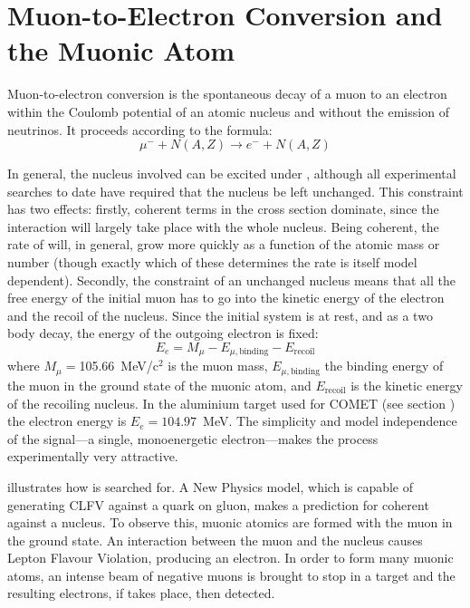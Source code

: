 
\chapter{Muon-to-Electron Conversion and the Muonic Atom}
Muon-to-electron conversion is the spontaneous decay of a muon to an electron within the Coulomb potential of an atomic nucleus and without the emission of neutrinos.
It proceeds according to the formula:
\begin{equation}
\mu^{-}+N(A,Z) \rightarrow e^{-}+N(A,Z)
\end{equation}

In general, the nucleus involved can be excited under \mueconv, although all experimental searches to date have required that the nucleus be left unchanged.
This constraint has two effects: firstly, coherent terms in the \mueconv cross section dominate, since the interaction will largely take place with the whole nucleus.
Being coherent, the rate of \mueconv will, in general, grow more quickly as a function of the atomic mass or number (though exactly which of these determines the rate is itself model dependent).
Secondly, the constraint of an unchanged nucleus means that all the free energy of the initial muon has to go into the kinetic energy of the electron and the recoil of the nucleus.
Since the initial system is at rest, and as a two body decay, the energy of the outgoing electron is fixed:
\begin{equation}
E_e=M_\mu-E_{\mu,\mathrm{binding}}-E_\mathrm{recoil}
\end{equation}
where $M_\mu=$105.66~MeV/c$^2$ is the muon mass, $E_{\mu,\mathrm{binding}}$ the
binding energy of the muon in the ground state of the muonic atom, and
$E_\mathrm{recoil}$ is the kinetic energy of the recoiling nucleus.
In the aluminium target used for COMET (see section ) the electron energy is $E_e=104.97$~MeV.
The simplicity and model independence of the signal---a single, monoenergetic electron---makes the process experimentally very attractive.

\FigMuecCreation
{} illustrates how \mueconv is searched for.
A New Physics model, which is capable of generating \ac{CLFV} against a quark on gluon, makes a prediction for coherent \mueconv against a nucleus.
To observe this, muonic atomics are formed with the muon in the ground state.
An interaction between the muon and the nucleus causes Lepton Flavour Violation, producing an electron.
In order to form many muonic atoms, an intense beam of negative muons is brought to stop in a target and the resulting electrons, if \mueconv takes place, then detected.

